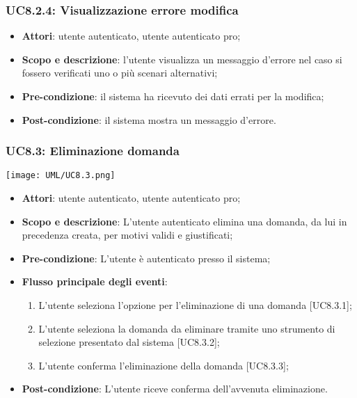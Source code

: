 	\subsubsection{UC8.2.4: Visualizzazione errore modifica}
	\begin{itemize}
		\item
			\textbf{Attori}: utente autenticato, utente autenticato pro;
		\item
			\textbf{Scopo e descrizione}: l'utente visualizza un messaggio d'errore nel caso si fossero verificati uno o più scenari alternativi;
		\item		
			\textbf{Pre-condizione}: il sistema ha ricevuto dei dati errati per la modifica;
		\item
			\textbf{Post-condizione}: il sistema mostra un messaggio d'errore.
	\end{itemize}	
	
	\subsubsection{UC8.3: Eliminazione domanda}	
	\begin{center}
		\texttt{[image: UML/UC8.3.png]}
	\end{center}
	\begin{itemize}
		\item
			\textbf{Attori}: utente autenticato, utente autenticato pro;
		\item		
			\textbf{Scopo e descrizione}: L'utente autenticato elimina una domanda, da lui in precedenza creata, per motivi validi e giustificati;
		\item
			\textbf{Pre-condizione}: L'utente è autenticato presso il sistema;
		\item
			\textbf{Flusso principale degli eventi}:
	       		\begin{enumerate}
					\item 	
					L'utente seleziona l'opzione per l'eliminazione di una domanda [UC8.3.1];
					\item
					L'utente seleziona la domanda da eliminare tramite uno strumento di selezione presentato dal sistema [UC8.3.2];
					\item
					L'utente conferma l'eliminazione della domanda [UC8.3.3];
	 			\end{enumerate}
		\item
			\textbf{	Post-condizione}: L'utente riceve conferma dell'avvenuta eliminazione.
	\end{itemize}
